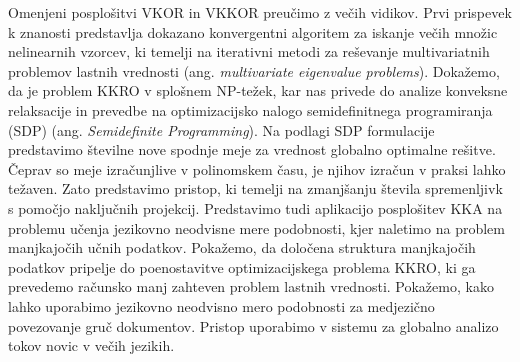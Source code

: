 Omenjeni posplošitvi VKOR in VKKOR preučimo z večih vidikov. Prvi prispevek k znanosti predstavlja
dokazano konvergentni algoritem za iskanje večih množic nelinearnih vzorcev, 
ki temelji na iterativni metodi za reševanje multivariatnih problemov lastnih vrednosti (ang. 
\emph{multivariate eigenvalue problems}). Dokažemo, da je problem KKRO v splošnem NP-težek,
kar nas privede do analize konveksne relaksacije in prevedbe na optimizacijsko nalogo
semidefinitnega programiranja (SDP) (ang. \emph{Semidefinite Programming}). Na podlagi
SDP formulacije predstavimo številne nove spodnje meje za vrednost globalno optimalne
rešitve. Čeprav so meje izračunjlive v polinomskem času, je njihov izračun v praksi
lahko težaven. Zato predstavimo pristop, ki temelji na zmanjšanju števila spremenljivk s
pomočjo naključnih projekcij. Predstavimo tudi aplikacijo posplošitev KKA na problemu
učenja jezikovno neodvisne mere podobnosti, kjer naletimo na problem manjkajočih
učnih podatkov. Pokažemo, da določena struktura manjkajočih podatkov pripelje do
poenostavitve optimizacijskega problema KKRO, ki ga prevedemo računsko manj zahteven 
problem lastnih vrednosti. Pokažemo, kako lahko uporabimo jezikovno neodvisno mero podobnosti
za medjezično povezovanje gruč dokumentov. Pristop uporabimo v sistemu za globalno analizo
tokov novic v večih jezikih.


